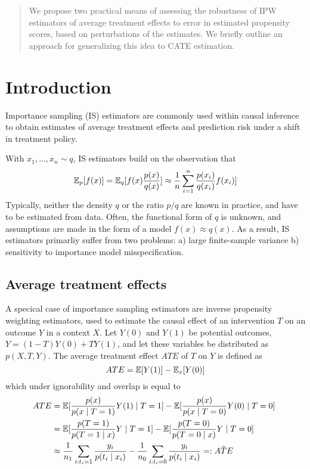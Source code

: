 %
%
\begin{abstract}
We propose two practical means of assessing the robustness of IPW estimators of average treatment effects to error in estimated propensity scores, based on perturbations of the estimates. We briefly outline an approach for generalizing this idea to CATE estimation.
\end{abstract}

\section{Introduction}
Importance sampling (IS) estimators are commonly used within causal inference to obtain estimates of average treatment effects and prediction risk under a shift in treatment policy.

With $x_1, ..., x_n \sim q$, IS estimators build on the observation that
$$
\mathbb{E}_p[f(x)] = \mathbb{E}_q[f(x)\frac{p(x)}{q(x)}] \approx \frac{1}{n}\sum_{i=1}^n \frac{p(x_i)}{q(x_i)}f(x_i)]
$$
Typically, neither the density $q$ or the ratio $p/q$ are known in practice, and have to be estimated from data. Often, the functional form of $q$ is unknown, and assumptions are made in the form of a model $f(x) \approx q(x)$. As a result, IS estimators primarliy suffer from two problems: a) large finite-sample variance b) sensitivity to importance model misspecification.

\subsection{Average treatment effects}
A specical case of importance sampling estimators are inverse propensity weighting estimators, used to estimate the causal effect of an intervention $T$ on an outcome $Y$ in a context $X$. Let $Y(0)$ and $Y(1)$ be potential outcomes, $Y = (1-T)Y(0) + T Y(1)$, and let these variables be distributed as $p(X, T, Y)$. The average treatment effect $ATE$ of $T$ on $Y$ is defined as
$$
ATE = \mathbb{E}[Y(1)] - \mathbb{E}_x[Y(0)]
$$
which under ignorability and overlap is equal to
\begin{align}
ATE & = \E[\frac{p(x)}{p(x\mid T=1)} Y(1) \mid T=1] - \E[\frac{p(x)}{p(x\mid T=0)} Y(0) \mid T=0] \\
& = \E[\frac{p(T=1)}{p(T=1 \mid x)} Y \mid T=1] - \E[\frac{p(T=0)}{p(T=0 \mid x)} Y \mid T=0] \\
& \approx \frac{1}{n_1}\sum_{i : t_i = 1}\frac{y_i}{p(t_i \mid x_i)} - \frac{1}{n_0}\sum_{i : t_i = 0}\frac{y_i}{p(t_i \mid x_i)} =: \hat{ATE}
\end{align}

